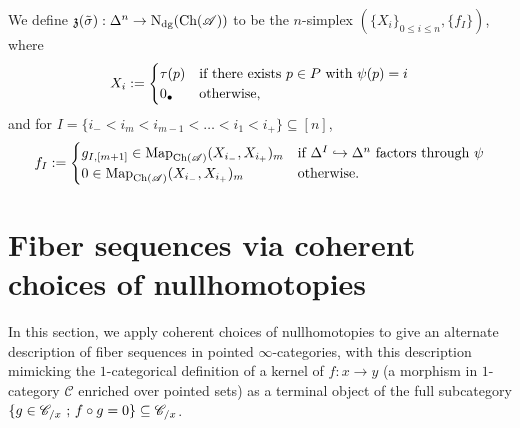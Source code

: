 \documentclass{tac}
\newcommand{\f}[1]{\mathfrak{#1}}
\newcommand{\s}[1]{\mathscr{#1}}
\newcommand{\tx}[1]{\textnormal{#1}}
\begin{document}
\begin{rmk}
We define $\f{z}(\tilde{\sigma}) : \Delta^n \to \tx{N}_{\tx{dg}} (\tx{Ch}(\s{A}))$ to be the $n$-simplex $( \{ X_i \}_{0\leq i \leq n} , \{ f_I \} )$, where
\[ X_i := \begin{cases} \tau (p) & \tx{if there exists }p\in P\tx{ with }\psi(p)=i \\ 
0_\bullet & \tx{otherwise,}\end{cases} \]
and for $I = \{ i_- < i_m < i_{m -1} < \dots < i_1 < i_+ \} \subseteq [n]$,
\[ f_I := \begin{cases} g_{I, [m+1]} \in \tx{Map}_{\tx{Ch}(\s{A})} (X_{i_-}, X_{i_+})_m & \tx{if } \Delta^I \hookrightarrow \Delta^n \tx{ factors through }\psi \\
0 \in \tx{Map}_{\tx{Ch}(\s{A})} (X_{i_-}, X_{i_+})_m  & \tx{otherwise}. \end{cases} \]
\end{rmk}

\section{Fiber sequences via coherent choices of nullhomotopies}

In this section, we apply coherent choices of nullhomotopies to give an alternate description of fiber sequences in pointed $\infty$-categories, with this description mimicking the $1$-categorical definition of a kernel of $f: x\to y$ (a morphism in $1$-category $\s{C}$ enriched over pointed sets) as a terminal object of the full subcategory $\{ g\in \s{C}_{/x}\tx{ ; } f\circ g=0 \} \subseteq \s{C}_{/x}$.
\end{document}
